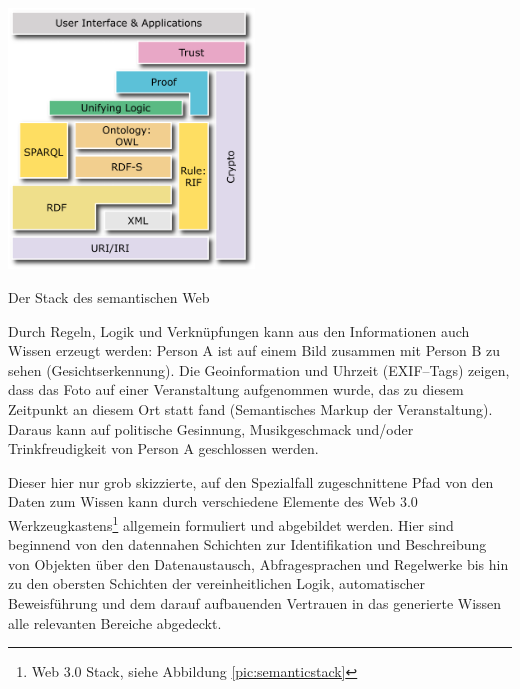 \begin{floatingfigure}[r]{0.5\textwidth}
\includegraphics[width=0.49\textwidth]{layerCake-4.png}
\caption[Der Stack des semantischen Web]{Der Stack des semantischen Web\protect\footnotemark}
\label{pic:semanticstack}
\end{floatingfigure}
Durch Regeln, Logik und Verknüpfungen kann aus den Informationen auch Wissen erzeugt werden:
Person A ist auf einem Bild zusammen mit Person B zu sehen (Gesichtserkennung). Die Geoinformation und Uhrzeit (EXIF--Tags) zeigen, dass das Foto auf einer Veranstaltung aufgenommen wurde, das zu diesem Zeitpunkt an diesem Ort statt fand (Semantisches Markup der Veranstaltung).
Daraus kann auf politische Gesinnung, Musikgeschmack und/oder Trinkfreudigkeit von Person A geschlossen werden.

Dieser hier nur grob skizzierte, auf den Spezialfall zugeschnittene Pfad von den Daten zum Wissen kann durch verschiedene Elemente des Web 3.0 Werkzeugkastens\footnote{Web 3.0 Stack, siehe Abbildung \ref{pic:semanticstack}} allgemein formuliert und abgebildet werden. Hier sind beginnend von den datennahen Schichten zur Identifikation und Beschreibung von Objekten über den Datenaustausch, Abfragesprachen und Regelwerke bis hin zu den obersten Schichten der vereinheitlichen Logik, automatischer Beweisführung und dem darauf aufbauenden Vertrauen in das generierte Wissen alle relevanten Bereiche abgedeckt.

